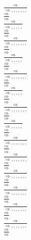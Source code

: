 \documentclass[11pt]{article}
\begin{document}
\begin{center}
\\$\frac{\Rightarrow }{\Rightarrow , , , , , , , }$
\bigskip
\\$\frac{\Rightarrow }{\Rightarrow }$
\bigskip
\\$\frac{\Rightarrow }{\Rightarrow , , , , , }$
\bigskip
\\$\frac{\Rightarrow }{\Rightarrow }$
\bigskip
\\$\frac{\Rightarrow }{\Rightarrow , , , , , , , }$
\bigskip
\\$\frac{\Rightarrow }{\Rightarrow }$
\bigskip
\\$\frac{\Rightarrow }{\Rightarrow , , , , , }$
\bigskip
\\$\frac{\Rightarrow }{\Rightarrow }$
\bigskip
\\$\frac{\Rightarrow }{\Rightarrow , , , , , , , }$
\bigskip
\\$\frac{\Rightarrow }{\Rightarrow }$
\bigskip
\\$\frac{\Rightarrow }{\Rightarrow , , , , , }$
\bigskip
\\$\frac{\Rightarrow }{\Rightarrow }$
\bigskip
\\$\frac{\Rightarrow }{\Rightarrow , , , , , , , }$
\bigskip
\\$\frac{\Rightarrow }{\Rightarrow }$
\bigskip
\\$\frac{\Rightarrow }{\Rightarrow , , , , , }$
\bigskip
\\$\frac{\Rightarrow }{\Rightarrow }$
\bigskip
\\$\frac{\Rightarrow }{\Rightarrow , , , , , , , }$
\bigskip
\\$\frac{\Rightarrow }{\Rightarrow }$
\bigskip
\\$\frac{\Rightarrow }{\Rightarrow , , , , , , , }$
\bigskip
\\$\frac{\Rightarrow }{\Rightarrow }$
\bigskip
\\$\frac{\Rightarrow }{\Rightarrow , , , , , , , }$
\bigskip
\\$\frac{\Rightarrow }{\Rightarrow }$
\bigskip
\\$\frac{\Rightarrow }{\Rightarrow , , , , , , , }$
\bigskip
\\$\frac{\Rightarrow }{\Rightarrow }$
\bigskip
\\$\frac{\Rightarrow }{\Rightarrow , , , , , , , }$
\bigskip
\\$\frac{\Rightarrow }{\Rightarrow }$
\bigskip
\\$\frac{\Rightarrow }{\Rightarrow , , , , , , , }$
\bigskip
\\$\frac{\Rightarrow }{\Rightarrow }$

\end{center}
\end{document}
